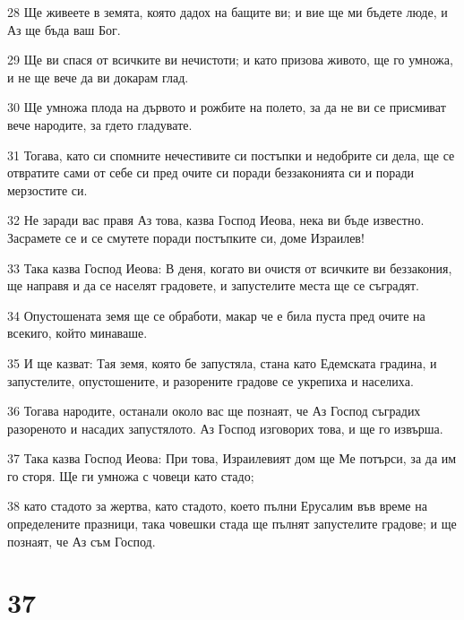 \par 28 Ще живеете в земята, която дадох на бащите ви; и вие ще ми бъдете люде, и Аз ще бъда ваш Бог.
\par 29 Ще ви спася от всичките ви нечистоти; и като призова живото, ще го умножа, и не ще вече да ви докарам глад.
\par 30 Ще умножа плода на дървото и рожбите на полето, за да не ви се присмиват вече народите, за гдето гладувате.
\par 31 Тогава, като си спомните нечестивите си постъпки и недобрите си дела, ще се отвратите сами от себе си пред очите си поради беззаконията си и поради мерзостите си.
\par 32 Не заради вас правя Аз това, казва Господ Иеова, нека ви бъде известно. Засрамете се и се смутете поради постъпките си, доме Израилев!
\par 33 Така казва Господ Иеова: В деня, когато ви очистя от всичките ви беззакония, ще направя и да се населят градовете, и запустелите места ще се съградят.
\par 34 Опустошената земя ще се обработи, макар че е била пуста пред очите на всекиго, който минаваше.
\par 35 И ще казват: Тая земя, която бе запустяла, стана като Едемската градина, и запустелите, опустошените, и разорените градове се укрепиха и населиха.
\par 36 Тогава народите, останали около вас ще познаят, че Аз Господ съградих разореното и насадих запустялото. Аз Господ изговорих това, и ще го извърша.
\par 37 Така казва Господ Иеова: При това, Израилевият дом ще Ме потърси, за да им го сторя. Ще ги умножа с човеци като стадо;
\par 38 като стадото за жертва, като стадото, което пълни Ерусалим във време на определените празници, така човешки стада ще пълнят запустелите градове; и ще познаят, че Аз съм Господ.

\chapter{37}

